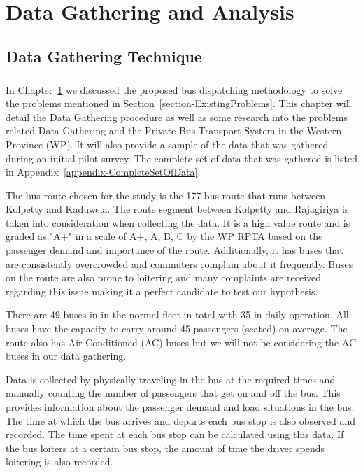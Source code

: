 \documentclass[12pt, oneside]{report}
\begin{document}
\newpage

\chapter {Data Gathering and Analysis}
\label{chapter-DataGatheringAndAnalysis}

\section{Data Gathering Technique}

\paragraph{ } In Chapter~\ref{chapter-DataGatheringAndAnalysis} we discussed the proposed bus dispatching methodology to solve the problems mentioned in Section~\ref{section-ExistingProblems}. This chapter will detail the Data Gathering procedure as well as some research into the problems related Data Gathering and the Private Bus Transport System in the Western Province (WP). It will also provide a sample of the data that was gathered during an initial pilot survey. The complete set of data that was gathered is listed in Appendix~\ref{appendix-CompleteSetOfData}.

The bus route chosen for the study is the 177 bus route that runs between Kolpetty and Kaduwela. The route segment between Kolpetty and Rajagiriya is taken into consideration when collecting the data. It is a high value route and is graded as "A+" in a scale of A+, A, B, C by the WP RPTA based on the passenger demand and importance of the route. Additionally, it has buses that are consistently overcrowded and commuters complain about it frequently. Buses on the route are also prone to loitering and many complaints are received regarding this issue making it a perfect candidate to test our hypothesis.

There are 49 buses in in the normal fleet in total with 35 in daily operation. All buses have the capacity to carry around 45 passengers (seated) on average. The route also has Air Conditioned (AC) buses but we will not be considering the AC buses in our data gathering.

Data is collected by physically traveling in the bus at the required times and manually counting the number of passengers that get on and off the bus. This provides information about the passenger demand and load situations in the bus. The time at which the bus arrives and departs each bus stop is also observed and recorded. The time spent at each bus stop can be calculated using this data. If the bus loiters at a certain bus stop, the amount of time the driver spends loitering is also recorded.
\end{document}
